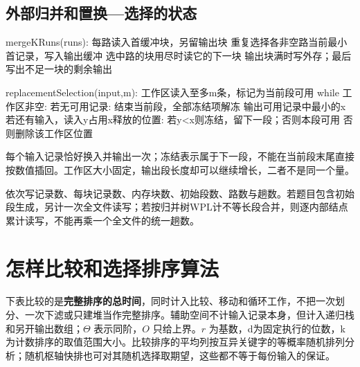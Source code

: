\subsection{外部归并和置换---选择的状态}\label{DS08-external-code}

\begin{codeblock}[language={}]
mergeKRuns(runs):
    每路读入首缓冲块，另留输出块
    重复选择各非空路当前最小首记录，写入输出缓冲
    选中路的块用尽时读它的下一块
    输出块满时写外存；最后写出不足一块的剩余输出
\end{codeblock}

\begin{codeblock}[language={}]
replacementSelection(input,m):
    工作区读入至多m条，标记为当前段可用
    while 工作区非空:
        若无可用记录: 结束当前段，全部冻结项解冻
        输出可用记录中最小的x
        若还有输入，读入y占用x释放的位置:
            若y<x则冻结，留下一段；否则本段可用
        否则删除该工作区位置
\end{codeblock}

每个输入记录恰好换入并输出一次；冻结表示属于下一段，不能在当前段末尾直接按数值插回。工作区大小固定，输出段长度却可以继续增长，二者不是同一个量。

\begin{methodbox}[外部排序先统一单位再计I/O]

依次写记录数、每块记录数、内存块数、初始段数、路数与趟数。若题目包含初始段生成，另计一次全文件读写；若按归并树WPL计不等长段合并，则逐内部结点累计读写，不能再乘一个全文件的统一趟数。

\end{methodbox}

\section{怎样比较和选择排序算法}\label{DS08-11}

下表比较的是\textbf{完整排序的总时间}，同时计入比较、移动和循环工作，不把一次划分、一次下滤或只建堆当作完整排序。辅助空间不计输入记录本身，但计入递归栈和另开输出数组；\(\Theta\) 表示同阶，\(O\) 只给上界。\(r\) 为基数，d为固定执行的位数，k为计数排序的取值范围大小。比较排序的平均列按互异关键字的等概率随机排列分析；随机枢轴快排也可对其随机选择取期望，这些都不等于每份输入的保证。

